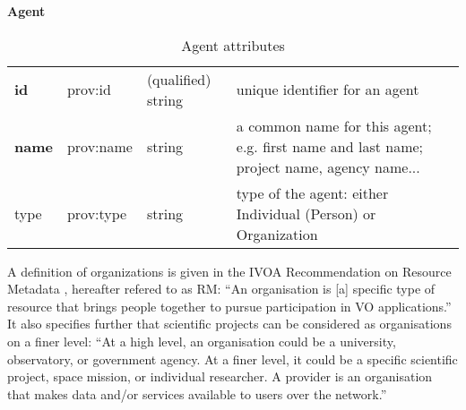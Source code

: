 \begin{table}[h]
\small
{}\textwidth
\textbf{\normalsize Agent}\vspace{0.25em}\\
\begin{tabulary}{1.0\textwidth}{@{}llp{2cm}L@{}}
\toprule
{} &  &  & \\
\midrule
\textbf{id} & prov:id & (qualified) string & unique identifier for an agent\\
\textbf{name} & prov:name & string & a common name for this agent; e.g. first name and last name; project name, agency name...\\
type & prov:type & string & type of the agent: either Individual (Person) or Organization\\
\bottomrule
\end{tabulary}
\caption{Agent attributes}
\label{tab:agent-attributes}
\end{table}



A definition of organizations is given in the 
IVOA Recommendation on Resource Metadata \citep{std:ResourceMeta}, hereafter 
refered to as RM: ``An organisation is [a] specific type of resource that 
brings people together to pursue participation in VO applications.''
It also specifies further that scientific projects can be considered 
as organisations on a finer level:
``At a high level, an organisation could be a university, observatory, or government
agency. At a finer level, it could be a specific scientific project, space mission,
or individual researcher. A provider is an organisation that makes data and/or services
available to users over the network.''




